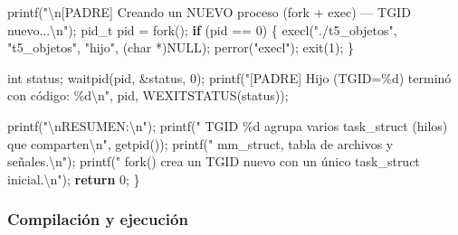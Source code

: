 \documentclass[
  spanish,
]{article}
\newenvironment{Shaded}{}{}
\newcommand{\ControlFlowTok}[1]{\textcolor[rgb]{0.00,0.44,0.13}{\textbf{#1}}}
\newcommand{\DataTypeTok}[1]{\textcolor[rgb]{0.56,0.13,0.00}{#1}}
\newcommand{\DecValTok}[1]{\textcolor[rgb]{0.25,0.63,0.44}{#1}}
\newcommand{\NormalTok}[1]{#1}
\newcommand{\OperatorTok}[1]{\textcolor[rgb]{0.40,0.40,0.40}{#1}}
\newcommand{\SpecialCharTok}[1]{\textcolor[rgb]{0.25,0.44,0.63}{#1}}
\newcommand{\StringTok}[1]{\textcolor[rgb]{0.25,0.44,0.63}{#1}}
\begin{document}
\begin{Shaded}
\begin{Highlighting}[]
\NormalTok{    printf}\OperatorTok{(}\StringTok{"}\SpecialCharTok{\textbackslash{}n}\StringTok{[PADRE] Creando un NUEVO proceso (fork + exec) — TGID nuevo...}\SpecialCharTok{\textbackslash{}n}\StringTok{"}\OperatorTok{);}
\NormalTok{    pid\_t pid }\OperatorTok{=}\NormalTok{ fork}\OperatorTok{();}
    \ControlFlowTok{if} \OperatorTok{(}\NormalTok{pid }\OperatorTok{==} \DecValTok{0}\OperatorTok{)} \OperatorTok{\{}
\NormalTok{        execl}\OperatorTok{(}\StringTok{"./t5\_objetos"}\OperatorTok{,} \StringTok{"t5\_objetos"}\OperatorTok{,} \StringTok{"hijo"}\OperatorTok{,} \OperatorTok{(}\DataTypeTok{char} \OperatorTok{*)}\NormalTok{NULL}\OperatorTok{);}
\NormalTok{        perror}\OperatorTok{(}\StringTok{"execl"}\OperatorTok{);}
\NormalTok{        exit}\OperatorTok{(}\DecValTok{1}\OperatorTok{);}
    \OperatorTok{\}}

    \DataTypeTok{int}\NormalTok{ status}\OperatorTok{;}
\NormalTok{    waitpid}\OperatorTok{(}\NormalTok{pid}\OperatorTok{,} \OperatorTok{\&}\NormalTok{status}\OperatorTok{,} \DecValTok{0}\OperatorTok{);}
\NormalTok{    printf}\OperatorTok{(}\StringTok{"[PADRE] Hijo (TGID=}\SpecialCharTok{\%d}\StringTok{) terminó con código: }\SpecialCharTok{\%d\textbackslash{}n}\StringTok{"}\OperatorTok{,}\NormalTok{ pid}\OperatorTok{,}\NormalTok{ WEXITSTATUS}\OperatorTok{(}\NormalTok{status}\OperatorTok{));}

\NormalTok{    printf}\OperatorTok{(}\StringTok{"}\SpecialCharTok{\textbackslash{}n}\StringTok{RESUMEN:}\SpecialCharTok{\textbackslash{}n}\StringTok{"}\OperatorTok{);}
\NormalTok{    printf}\OperatorTok{(}\StringTok{"  TGID }\SpecialCharTok{\%d}\StringTok{ agrupa varios task\_struct (hilos) que comparten}\SpecialCharTok{\textbackslash{}n}\StringTok{"}\OperatorTok{,}\NormalTok{ getpid}\OperatorTok{());}
\NormalTok{    printf}\OperatorTok{(}\StringTok{"  mm\_struct, tabla de archivos y señales.}\SpecialCharTok{\textbackslash{}n}\StringTok{"}\OperatorTok{);}
\NormalTok{    printf}\OperatorTok{(}\StringTok{"  fork() crea un TGID nuevo con un único task\_struct inicial.}\SpecialCharTok{\textbackslash{}n}\StringTok{"}\OperatorTok{);}
    \ControlFlowTok{return} \DecValTok{0}\OperatorTok{;}
\OperatorTok{\}}
\end{Highlighting}
\end{Shaded}

\subsubsection{Compilación y
ejecución}\label{compilaciuxf3n-y-ejecuciuxf3n-4}
\end{document}
